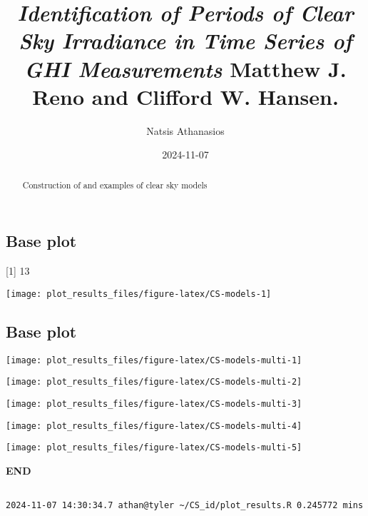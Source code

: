 \documentclass[
  10pt,
  a4paper,oneside]{article}
\title{\emph{Identification of Periods of Clear Sky Irradiance in Time Series of GHI Measurements} Matthew J. Reno and Clifford W. Hansen.}
\author{Natsis Athanasios}
\date{2024-11-07}
\begin{document}
\maketitle
\begin{abstract}
Construction of and examples of clear sky models
\end{abstract}

{
\hypersetup{linkcolor=}
\setcounter{tocdepth}{2}
\tableofcontents
}
\subsection{Base plot}\label{base-plot}

{[}1{]} 13

\begin{center}\texttt{[image: plot\_results\_files/figure-latex/CS-models-1]} \end{center}

\subsection{Base plot}\label{base-plot-1}

\begin{center}\texttt{[image: plot\_results\_files/figure-latex/CS-models-multi-1]} \end{center}

\begin{center}\texttt{[image: plot\_results\_files/figure-latex/CS-models-multi-2]} \end{center}

\begin{center}\texttt{[image: plot\_results\_files/figure-latex/CS-models-multi-3]} \end{center}

\begin{center}\texttt{[image: plot\_results\_files/figure-latex/CS-models-multi-4]} \end{center}

\begin{center}\texttt{[image: plot\_results\_files/figure-latex/CS-models-multi-5]} \end{center}

\textbf{END}

\begin{verbatim}

2024-11-07 14:30:34.7 athan@tyler ~/CS_id/plot_results.R 0.245772 mins
\end{verbatim}
\end{document}
